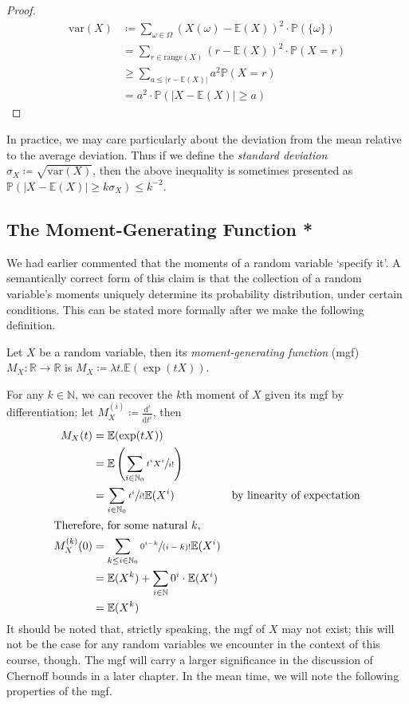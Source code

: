 		\begin{proof}
			\begin{align*}
				\mathrm{var}(X) &\coloneqq \sum_{\omega \in \Omega} (X(\omega) - \mathbb{E}(X))^2\cdot\mathbb{P}(\{\omega\})\\
						&= \sum_{r \in \mathrm{range}(X)} (r - \mathbb{E}(X))^2 \cdot\mathbb{P}(X = r)\\
						&\geq \sum_{a \leq |r - \mathbb{E}(X)|} a^2 \mathbb{P}(X=r) \\
						&= a^2 \cdot \mathbb{P}(|X-\mathbb{E}(X)| \geq a)
			\end{align*}
		\end{proof}
		
		In practice, we may care particularly about the deviation from the mean relative to the average deviation. 
		Thus if we define the \emph{standard deviation} $\sigma_X \coloneqq \sqrt{\mathrm{var}(X)}$, then the above inequality is 
		sometimes presented as $\mathbb{P}(|X - \mathbb{E}(X)| \geq k \sigma_X) \leq k^{-2}$.

	\subsection{The Moment-Generating Function *}
		We had earlier commented that the moments of a random variable `specify it'. A semantically correct form of this claim is
		that the collection of a random variable's moments uniquely determine its probability distribution, under certain conditions. 
		This can be stated more formally after we make the following definition.
		\begin{definition}
			Let $X$ be a random variable, then its \emph{moment-generating function} (mgf) $M_X : \mathbb{R} \rightarrow \mathbb{R}$
			is $M_X \coloneqq \lambda t . \mathbb{E}(\exp(tX))$.
		\end{definition}
		For any $k \in \mathbb{N}$, we can recover the $k$th moment of $X$ given its mgf by differentiation; let $M_X^{(i)} \coloneqq 
		\frac{\mathrm{d}^{i}}{\mathrm{d}t^i}$, then
		\begin{align*}
			M_X(t) &= \mathbb{E}(\exp(tX)) \\
			       &= \mathbb{E}\left(\sum_{i \in \mathbb{N}_0} \sfrac{t^iX^i}{i!} \right) \\
			       &= \sum_{i \in \mathbb{N}_0} \sfrac{t^i}{i!} \mathbb{E}(X^i) & \text{by linearity of expectation} \\
			       \intertext{Therefore, for some natural $k$,}
			M_X^{(k)}(0) &= \sum_{k \leq i \in \mathbb{N}_0} \sfrac{0^{i-k}}{(i-k)!} \mathbb{E}(X^i) \\
			             &= \mathbb{E}(X^k) + \sum_{i \in \mathbb{N}} 0^i \cdot \mathbb{E}(X^i) \\
				     &= \mathbb{E}(X^k)
		\end{align*}
		It should be noted that, strictly speaking, the mgf of $X$ may not exist; this will not be the case for any random variables we 
		encounter in the context of this course, though. The mgf will
		carry a larger significance in the discussion of Chernoff bounds in a later chapter. In the mean time, we will note the following
		properties of the mgf.
		
